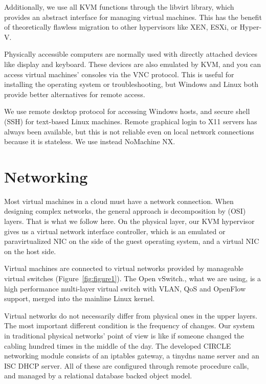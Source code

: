 \documentclass{llncs}
\begin{document}
Additionally, we use all KVM functions through the libvirt library, which provides an abstract interface for managing virtual machines.\cite{victoria2009creating} This has the benefit of theoretically flawless migration to other hypervisors like XEN, ESXi, or Hyper-V.\cite{bolte2010non}

Physically accessible computers are normally used with directly attached devices like display and keyboard. These devices are also emulated by KVM, and you can access virtual machines' consoles via the VNC protocol. This is useful for installing the operating system or troubleshooting, but Windows and Linux both provide better alternatives for remote access.

We use remote desktop protocol for accessing Windows hosts, and secure shell (SSH) for text-based Linux machines. Remote graphical login to X11 servers has always been available, but this is not reliable even on local network connections because it is stateless. We use instead NoMachine NX\cite{pinzari2003introduction}.
   
\section{Networking}
Most virtual machines in a cloud must have a network connection. When designing complex networks, the general approach is decomposition by (OSI) layers. That is what we follow here. On the physical layer, our KVM hypervisor gives us a virtual network interface controller, which is an emulated or paravirtualized NIC on the side of the guest operating system, and a virtual NIC on the host side.

Virtual machines are connected to virtual networks provided by manageable virtual switches (Figure~\ref{fig:figure1}). The Open vSwitch.\cite{pfaff2009extending}, what we are using, is a high performance multi-layer virtual switch with VLAN, QoS and OpenFlow support, merged into the mainline Linux kernel.

Virtual networks do not necessarily differ from physical ones in the upper layers. The most important different condition is the frequency of changes. Our system in traditional physical networks' point of view is like if someone changed the cabling hundred times in the middle of the day. The developed CIRCLE networking module consists of an iptables gateway, a tinydns name server and an ISC DHCP server. All of these are configured through remote procedure calls, and managed by a relational database backed object model. 
\end{document}
